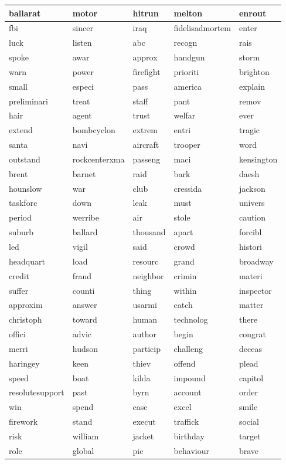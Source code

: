 \begin{longtable}{p{2.5cm}p{2.5cm}p{2.5cm}p{2.5cm}p{2.5cm}}
ballarat&motor&hitrun&melton&enrout\\ \hline 
fbi&sincer&iraq&fidelisadmortem&enter\\ \hline 
luck&listen&abc&recogn&rais\\ \hline 
spoke&awar&approx&handgun&storm\\ \hline 
warn&power&firefight&prioriti&brighton\\ \hline 
small&especi&pass&america&explain\\ \hline 
preliminari&treat&staff&pant&remov\\ \hline 
hair&agent&trust&welfar&ever\\ \hline 
extend&bombcyclon&extrem&entri&tragic\\ \hline 
santa&navi&aircraft&trooper&word\\ \hline 
outstand&rockcenterxma&passeng&maci&kensington\\ \hline 
brent&barnet&raid&bark&daesh\\ \hline 
hounslow&war&club&cressida&jackson\\ \hline 
taskforc&down&leak&must&univers\\ \hline 
period&werribe&air&stole&caution\\ \hline 
suburb&ballard&thousand&apart&forcibl\\ \hline 
led&vigil&said&crowd&histori\\ \hline 
headquart&load&resourc&grand&broadway\\ \hline 
credit&fraud&neighbor&crimin&materi\\ \hline 
suffer&counti&thing&within&inspector\\ \hline 
approxim&answer&usarmi&catch&matter\\ \hline 
christoph&toward&human&technolog&there\\ \hline 
offici&advic&author&begin&congrat\\ \hline 
merri&hudson&particip&challeng&deceas\\ \hline 
haringey&keen&thiev&offend&plead\\ \hline 
speed&boat&kilda&impound&capitol\\ \hline 
resolutesupport&past&byrn&account&order\\ \hline 
win&spend&case&excel&smile\\ \hline 
firework&stand&execut&traffick&social\\ \hline 
risk&william&jacket&birthday&target\\ \hline 
role&global&pic&behaviour&brave\\ \hline 

\end{longtable}

